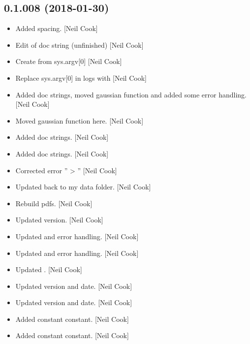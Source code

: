 \documentclass[a4paper,10pt,english]{report}
\begin{document}
\subsection{0.1.008 (2018-01-30)}
\label{\detokenize{misc/changelog:id496}}\begin{itemize}
\item {} 
Added spacing. {[}Neil Cook{]}

\item {} 
Edit of doc string (unfinished) {[}Neil Cook{]}

\item {} 
Create  from sys.argv{[}0{]} {[}Neil Cook{]}

\item {} 
Replace sys.argv{[}0{]} in logs with
 {[}Neil Cook{]}

\item {} 
Added doc strings, moved gaussian function and added some error
handling. {[}Neil Cook{]}

\item {} 
Moved gaussian function here. {[}Neil Cook{]}

\item {} 
Added doc strings. {[}Neil Cook{]}

\item {} 
Added doc strings. {[}Neil Cook{]}

\item {} 
Corrected error ” \textendash{}\textgreater{} ” {[}Neil Cook{]}

\item {} 
Updated back to my data folder. {[}Neil Cook{]}

\item {} 
Rebuild pdfs. {[}Neil Cook{]}

\item {} 
Updated version. {[}Neil Cook{]}

\item {} 
Updated  and error handling. {[}Neil Cook{]}

\item {} 
Updated  and error handling. {[}Neil Cook{]}

\item {} 
Updated . {[}Neil Cook{]}

\item {} 
Updated version and date. {[}Neil Cook{]}

\item {} 
Updated version and date. {[}Neil Cook{]}

\item {} 
Added  constant constant. {[}Neil Cook{]}

\item {} 
Added  constant constant. {[}Neil Cook{]}

\end{itemize}
\end{document}
